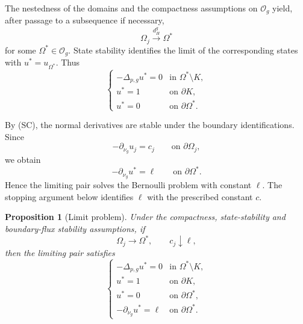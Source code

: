 \documentclass[11pt,a4paper]{article}
\newtheorem{proposition}[theorem]{Proposition}
\theoremstyle{definition}
\theoremstyle{remark}
\begin{document}
The nestedness of the domains and the compactness assumptions on
$\mathcal O_g$ yield, after passage to a subsequence if necessary,
\[
\Omega_j\xrightarrow{d_H^g}\Omega^\ast
\]
for some $\Omega^\ast\in\mathcal O_g$. State stability identifies the
limit of the corresponding states with $u^\ast=u_{\Omega^\ast}$.
Thus
\begin{equation}
\begin{cases}
-\Delta_{p,g}u^\ast=0
&\text{in }\Omega^\ast\setminus K,\\
u^\ast=1
&\text{on }\partial K,\\
u^\ast=0
&\text{on }\partial\Omega^\ast.
\end{cases}
\label{eq:limit-state}
\end{equation}

By (SC), the normal derivatives are stable under the boundary
identifications. Since
\[
-\partial_{\nu_g}u_j=c_j
\qquad\text{on }\partial\Omega_j,
\]
we obtain
\begin{equation}
-\partial_{\nu_g}u^\ast=\ell
\qquad\text{on }\partial\Omega^\ast.
\label{eq:limit-bernoulli-level}
\end{equation}
Hence the limiting pair solves the Bernoulli problem with constant
$\ell$. The stopping argument below identifies $\ell$ with the
prescribed constant $c$.

\begin{proposition}[Limit problem]
\label{prop:limit-problem}
Under the compactness, state-stability and boundary-flux stability
assumptions, if
\[
\Omega_j\to\Omega^\ast,
\qquad
c_j\downarrow\ell,
\]
then the limiting pair satisfies
\begin{equation}
\begin{cases}
-\Delta_{p,g}u^\ast=0
&\text{in }\Omega^\ast\setminus K,\\
u^\ast=1
&\text{on }\partial K,\\
u^\ast=0
&\text{on }\partial\Omega^\ast,\\
-\partial_{\nu_g}u^\ast=\ell
&\text{on }\partial\Omega^\ast.
\end{cases}
\end{equation}
\end{proposition}
\end{document}
